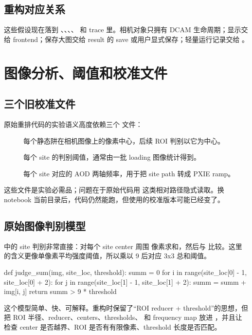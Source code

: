 \documentclass[11pt,oneside,openany]{book}
\begin{document}
\section{重构对应关系}
这些假设现在落到 、、、、 和  trace 里。相机对象只拥有 DCAM 生命周期；显示交给 frontend；保存大图交给 result 的 save 或用户显式保存；轻量运行记录交给 。

\chapter{图像分析、阈值和校准文件}
\section{三个旧校准文件}
原始重排代码的实验语义高度依赖三个  文件：
\begin{description}
  \item[] 每个静态阱在相机图像上的像素中心，后续 ROI 判别以它为中心。
  \item[] 每个 site 的判别阈值，通常由一批 loading 图像统计得到。
  \item[] 每个 site 对应的 AOD 两轴频率，用于把 site path 转成 PXIE ramp。
\end{description}
这些文件是实验必需品；问题在于原始代码用  这类相对路径隐式读取。换 notebook 当前目录后，代码仍然能跑，但使用的校准版本可能已经变了。

\section{原始图像判别模型}
 中的 site 判别非常直接：对每个 site center 周围  像素求和，然后与  比较。这里  的含义更像单像素平均强度阈值，所以乘以 9 后对应 3x3 总和阈值。

\begin{codeblock}[Python]
def judge_sum(img, site_loc, threshold):
    summ = 0
    for i in range(site_loc[0] - 1, site_loc[0] + 2):
        for j in range(site_loc[1] - 1, site_loc[1] + 2):
            summ = summ + img[i, j]
    return summ > 9 * threshold
\end{codeblock}

这个模型简单、快、可解释。重构时保留了“ROI reducer + threshold”的思想，但把 ROI 半径、reducer、centers、thresholds、 和 frequency map 放进 ，并且让  检查 center 是否越界、ROI 是否有有限像素、threshold 长度是否匹配。
\end{document}

